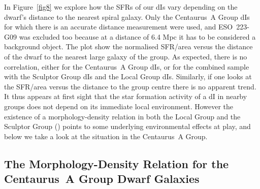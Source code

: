 \documentclass[preprint]{aastex}
\begin{document}
In Figure~\ref{fig8} we explore how the SFRs of our dIs vary depending
on the dwarf's distance to the nearest spiral galaxy.
Only the Centaurus~A Group dIs  
for which there is an accurate distance measurement were used, 
and ESO~223-G09 was excluded too because at a distance of 6.4 Mpc
it has to be considered a background object. 
The plot show the normalised SFR/area versus the distance of
the dwarf to the nearest large galaxy of the group. 
As expected, there is no correlation, either for the Centaurus~A Group dIs, 
or for the combined sample with the Sculptor Group dIs and the Local Group dIs. 
Similarly, if one looks
at the SFR/area versus the distance to the group centre there is no
apparent trend. It thus appears at first sight that the star formation activity of a dI in 
nearby groups does not depend on its immediate local environment.
However the existence of a morphology-density relation in both the Local Group
and the Sculptor Group (\citep{scm03a}) points to some underlying environmental
effects at play, and below we take a look at the situation in 
the Centaurus~A Group.

\subsection{The Morphology-Density Relation for the Centaurus~A Group Dwarf Galaxies}
\end{document}
